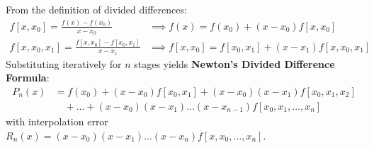\begin{theorembox}
From the definition of divided differences:
\begin{align}
    f[x, x_0] = \frac{f(x) - f(x_0)}{x - x_0} &\implies f(x) = f(x_0) + (x - x_0)f[x, x_0] \\
    f[x, x_0, x_1] = \frac{f[x, x_0] - f[x_0, x_1]}{x - x_1} &\implies f[x, x_0] = f[x_0, x_1] + (x - x_1)f[x, x_0, x_1]
\end{align}
Substituting iteratively for $n$ stages yields \textbf{Newton's Divided Difference Formula}:
\begin{equation}
    \boxed{\begin{aligned}
    P_n(x) &= f(x_0) + (x - x_0)f[x_0, x_1] + (x - x_0)(x - x_1)f[x_0, x_1, x_2] \\
    &\quad + \dots + (x - x_0)(x - x_1)\dots(x - x_{n-1})f[x_0, x_1, \dots, x_n]
    \end{aligned}}
\end{equation}
with interpolation error $R_n(x) = (x - x_0)(x - x_1)\dots(x - x_n) f[x, x_0, \dots, x_n]$.
\end{theorembox}


